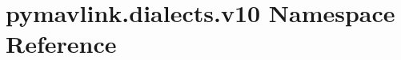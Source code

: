 \hypertarget{namespacepymavlink_1_1dialects_1_1v10}{}\section{pymavlink.\+dialects.\+v10 Namespace Reference}
\label{namespacepymavlink_1_1dialects_1_1v10}
